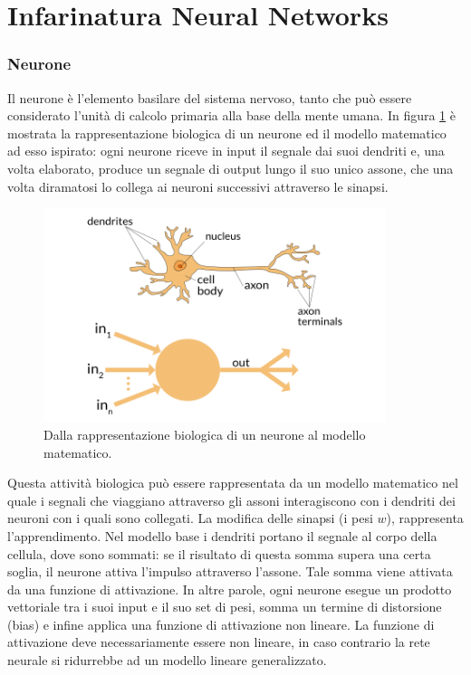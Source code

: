 


\section{Infarinatura Neural Networks}

\subsubsection{Neurone}
Il neurone è l'elemento basilare del sistema nervoso, tanto che può essere considerato l'unità di calcolo primaria alla base della mente umana. In figura \ref{img:neurone} è mostrata la rappresentazione biologica di un neurone ed il modello matematico ad esso ispirato: ogni neurone riceve in input il segnale dai suoi dendriti e, una volta elaborato, produce un segnale di output lungo il suo unico assone, che una volta diramatosi lo collega ai neuroni successivi attraverso le sinapsi.

\begin{figure}[htb]
	\centering
	\includegraphics[width = 100mm]{images/neuron.png}
	\caption{Dalla rappresentazione biologica di un neurone al modello matematico.}
	\label{img:neurone}
\end{figure}

Questa attività biologica può essere rappresentata da un modello matematico nel quale i segnali che viaggiano attraverso gli assoni interagiscono con i dendriti dei neuroni con i quali sono collegati. La modifica delle sinapsi (i pesi $w$), rappresenta l'apprendimento. Nel modello base i dendriti portano il segnale al corpo della cellula, dove sono sommati: se il risultato di questa somma supera una certa soglia, il neurone attiva l'impulso attraverso l'assone. Tale somma viene attivata da una funzione di attivazione. In altre parole, ogni neurone esegue un prodotto vettoriale tra i suoi input e il suo set di pesi, somma un termine di distorsione (bias) e infine applica una funzione di attivazione non lineare. La funzione di attivazione deve necessariamente essere non lineare, in caso contrario la rete neurale si ridurrebbe ad un modello lineare generalizzato.

